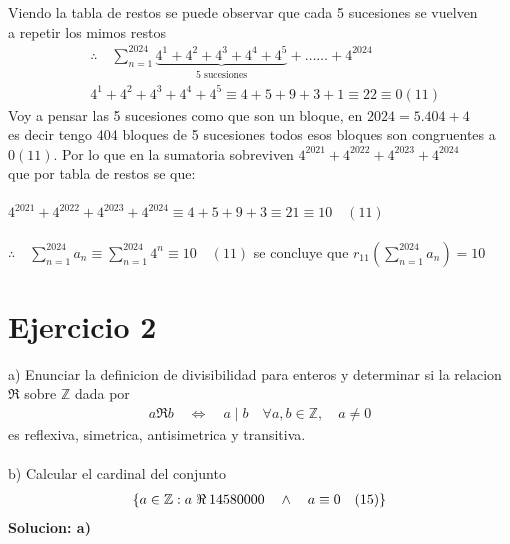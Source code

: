 \documentclass[a4paper]{article}
\begin{document}
Viendo la tabla de restos se puede observar que cada 5 sucesiones se vuelven \\
a repetir los mimos restos
\begin{align*}
&\therefore \quad \sum_{n=1}^{2024} \underbrace{4^1 + 4^2 + 4^3 + 4^4 + 4^5}_{\text{5 sucesiones}}  + \ldots \ldots  
+ 4^{2024} \\ 
&4^1 + 4^2 + 4^3 + 4^4 + 4^5 \equiv 4 + 5 + 9 + 3 + 1 \equiv 22 \equiv 0 (11) 
\end{align*}
Voy a pensar las 5 sucesiones como que son un bloque, en $2024 = 5.404 + 4$ \\
es decir tengo 404 bloques de 5 sucesiones todos esos bloques son congruentes a $0 (11)$.
Por lo que en la sumatoria sobreviven $4^{2021} + 4^{2022} + 4^{2023} + 4^{2024}$ \\
que por tabla de restos se que: \\ \\ $4^{2021} + 4^{2022} + 4^{2023} + 4^{2024} \equiv 4 + 5
+ 9 + 3 \equiv 21 \equiv 10 \quad (11)$ \\ \\
$\therefore \quad \sum_{n=1}^{2024} a_n \equiv \sum_{n=1}^{2024} 4^n \equiv 10 \quad (11)$  \hspace{15px}se concluye que  $r_{11}(\sum_{n=1}^{2024} a_n) = 10$

\section{Ejercicio 2}
a) Enunciar la definicion de divisibilidad para enteros y determinar si la relacion \\
$\Re$ sobre $\mathbb{Z}$ dada por
\begin{align*}
    a \Re b \quad \Longleftrightarrow \quad a \mid b \quad \forall a,b \in \mathbb{Z}, \quad a \neq 0
\end{align*}
es reflexiva, simetrica, antisimetrica y transitiva. \\ \\
b) Calcular el cardinal del conjunto
\begin{align*}
    \{a \in \mathbb{Z}: a \hspace{3px} \Re \hspace{2px}14580000 \quad \land \quad a \equiv 0 \quad(15)\}
\end{align*}
\textbf{Solucion: a)} \\
\end{document}
